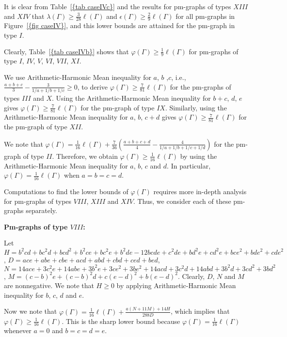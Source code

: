 \documentclass[12pt]{amsart}
\theoremstyle{example}
\theoremstyle{definition}
\theoremstyle{notation}
\begin{document}
It is clear from {Table~\ref{{tab caseIVc}}} and the results for pm-graphs of types $XIII$ and $XIV$ that ${\lambda ({\Gamma})} \geq \frac{3}{28} {\ell ({\Gamma})}$ and ${\epsilon({\Gamma})} \geq \frac{2}{9} {\ell ({\Gamma})}$ for all pm-graphs in {Figure~\ref{{fig caseIV}}}, and this lower bounds are attained for the pm-graph in type $I$.

Clearly, {Table~\ref{{tab caseIVb}}} shows that ${\varphi ({\Gamma})} \geq \frac{1}{9} {\ell ({\Gamma})}$ for pm-graphs of type $I$, $IV$, $V$, $VI$, $VII$, $XI$.

We use Arithmetic-Harmonic Mean inequality for $a$, $b$ ,$c$, i.e.,  $\frac{a+b+c}{3}-\frac{3}{1/a+1/b+1/c} \geq 0$, to derive
${\varphi ({\Gamma})} \geq \frac{7}{81} {\ell ({\Gamma})}$ for the pm-graphs of types $III$ and $X$. Using the Arithmetic-Harmonic Mean inequality for $b+c$, $d$, $e$ gives  ${\varphi ({\Gamma})} \geq \frac{7}{81} {\ell ({\Gamma})}$ for the pm-graph of type $IX$. Similarly, using the Arithmetic-Harmonic Mean inequality for $a$, $b$, $c+d$ gives  ${\varphi ({\Gamma})} \geq \frac{7}{81} {\ell ({\Gamma})}$ for the pm-graph of type $XII$.

We note that ${\varphi ({\Gamma})} = \frac{1}{16} {\ell ({\Gamma})} + \frac{7}{36}(\frac{a+b+c+d}{4} - \frac{4}{1/a+1/b+1/c+1/d})$ for the pm-graph of type $II$. Therefore, we obtain ${\varphi ({\Gamma})} \geq \frac{1}{16} {\ell ({\Gamma})}$ by using the Arithmetic-Harmonic Mean inequality for $a$, $b$, $c$ and $d$. In particular, ${\varphi ({\Gamma})} = \frac{1}{16} {\ell ({\Gamma})}$ when $a=b=c=d$.

Computations to find the lower bounds of ${\varphi ({\Gamma})}$ requires more in-depth analysis for pm-graphs of types $VIII$, $XIII$ and $XIV$. Thus, we consider each of these pm-graphs separately.

\textbf{Pm-graphs of type $VIII$:}

Let $H=b^2 c d+b c^2 d+b c d^2+b^2 c e+b c^2 e+b^2 d e-12 b c d e+c^2 d e+b d^2 e+c d^2 e+b c e^2+b d e^2+c d e^2$,
$D = a c e + a b e + c b e + a c d + a b d + c b d + c e d + b e d$, $N=14 a c e + 3 c^2 e + 14 a b e + 3 b^2 e + 3 c e^2 + 3 b e^2 +
  14 a c d + 3 c^2 d + 14 a b d + 3 b^2 d + 3 c d^2 + 3 b d^2$, $M= (c - b)^2 e +  (c - b)^2 d + c (e - d)^2 +
  b (e - d)^2$. Clearly, $D$, $N$ and $M$ are nonnegative.
We note that $H \geq 0$ by applying Arithmetic-Harmonic Mean inequality for $b$, $c$, $d$ and $e$.

Now we note that
${\varphi ({\Gamma})}=\frac{1}{16}{\ell ({\Gamma})}+\frac{a(N+11 M)+14 H}{288 D}$, which implies that ${\varphi ({\Gamma})} \geq \frac{1}{16}{\ell ({\Gamma})}$. This is the sharp lower bound because
${\varphi ({\Gamma})} = \frac{1}{16}{\ell ({\Gamma})}$ whenever $a=0$ and $b=c=d=e$.
\end{document}
